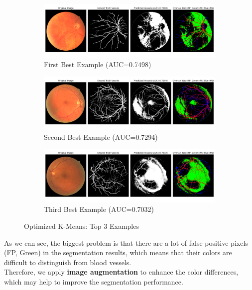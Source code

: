 \documentclass[12pt,letterpaper]{article}
\begin{document}
\begin{figure}[H]
    \centering
    \begin{subfigure}[H]{\textwidth}
        \centering
        \includegraphics[scale=0.35]{Figures/3 Optimized 1st.png}
        \vspace{-0.5cm}
        \caption{First Best Example (AUC=0.7498)}
        \label{fig:opt1}
    \end{subfigure}
    \begin{subfigure}[H]{\textwidth}
        \centering
        \includegraphics[scale=0.35]{Figures/3 Optimized 2nd.png}
        \vspace{-0.5cm}
        \caption{Second Best Example (AUC=0.7294)}
        \label{fig:opt2}
    \end{subfigure}
    \begin{subfigure}[H]{\textwidth}
        \centering
        \includegraphics[scale=0.35]{Figures/3 Optimized 3rd.png}
        \vspace{-0.5cm}
        \caption{Third Best Example (AUC=0.7032)}
        \label{fig:opt3}
    \end{subfigure}
    \caption{Optimized K-Means: Top 3 Examples}
    \label{fig:opt}
\end{figure}
\noindent
As we can see, the biggest problem is that there are a lot of false positive pixels (FP, Green) in the segmentation results, which means that their colors are difficult to distinguish from blood vessels. \\
Therefore, we apply \textbf{image augmentation} to enhance the color differences, which may help to improve the segmentation performance. 
\end{document}
